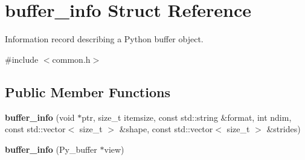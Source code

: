 \hypertarget{structbuffer__info}{}\section{buffer\+\_\+info Struct Reference}
\label{structbuffer__info}


Information record describing a Python buffer object.  




{\ttfamily \#include $<$common.\+h$>$}

\subsection*{Public Member Functions}
\begin{DoxyCompactItemize}
\item 
{\bfseries buffer\+\_\+info} (void $\ast$ptr, size\+\_\+t itemsize, const std\+::string \&format, int ndim, const std\+::vector$<$ size\+\_\+t $>$ \&shape, const std\+::vector$<$ size\+\_\+t $>$ \&strides)\hypertarget{structbuffer__info_a66e154a280712dbd407000657e1ff35d}{}\label{structbuffer__info_a66e154a280712dbd407000657e1ff35d}

\item 
{\bfseries buffer\+\_\+info} (Py\+\_\+buffer $\ast$view)\hypertarget{structbuffer__info_a262600ac44a5ec0cc664976d58d2e54a}{}\label{structbuffer__info_a262600ac44a5ec0cc664976d58d2e54a}

\end{DoxyCompactItemize}
